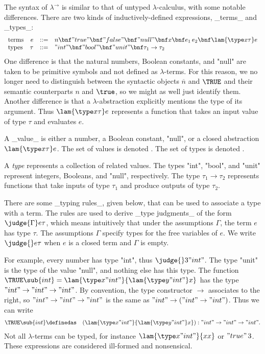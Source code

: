 The syntax of $\lambda^\to$ is similar to that of untyped $\lambda$-calculus, with some notable differences. There are two kinds of inductively-defined expressions, _terms_ and _types_:
\[
\begin{array}{lrcl}
\mbox{terms} & e &::=& n \bnf "true" \bnf "false" \bnf "null" \bnf x \bnf e_1\,e_2 \bnf \lam{\type x\tau}e\\
\mbox{types} & \tau &::=& "int" \bnf "bool" \bnf "unit" \bnf \tau _1 \to \tau _2
\end{array}
\]
One difference is that the natural numbers, Boolean constants, and "null" are taken to be primitive symbols and not defined as $\lambda$-terms. For this reason, we no longer need to distinguish between the syntactic objects $\overline n$ and $\TRUE$ and their semantic counterparts $n$ and $\true$, so we might as well just identify them.
Another difference is that a $\lambda$-abstraction explicitly mentions the type of its argument. Thus
$\lam{\type x\tau}e$ represents a function that takes an input value of type $\tau$ and evaluates $e$.

A _value_ is either a number, a Boolean constant, "null", or a closed abstraction $\lam{\type x\tau}e$. The set of values is denoted \Val. The set of types is denoted \Type.

A \emph{type} represents a collection of related values. The types "int", "bool", and "unit" represent integers, Booleans, and "null", respectively. The type $\tau_1\to\tau_2$ represents functions that take inputs of type $\tau_1$ and produce outputs of type $\tau_2$.

There are some _typing rules_, given below, that can be used to associate a type
with a term. The rules are used to derive _type judgments_ of the form 
$\judge{\Gamma}e\tau$, which means intuitively that under the assumptions
$\Gamma$, the term $e$ has type $\tau$.
The assumptions $\Gamma$ specify types for the free variables of $e$.
We write $\judge{}e\tau$ when $e$ is a closed term and $\Gamma$ is empty.

For example, every number has type "int", thus $\judge{}3{"int"}$.
The type "unit" is the type of the value "null", and nothing else
has this type. The function $\TRUE\sub{int} =
\lam{\type x{"int"}}{\lam{\type y{"int"}}x}$ has the type $"int"
\to "int" \to "int"$.
By convention, the type constructor $\to$ associates to the right, so
$"int" \to "int" \to "int"$
is the same as
$"int" \to ("int" \to "int")$.
Thus we can write
\begin{eqnarray*}
\TRUE\sub{int} &\definedas& (\lam{\type x{"int"}}{\lam{\type y{"int"}}x}) : "int" \to "int" \to "int".
\end{eqnarray*}
Not all $\lambda$-terms can be typed, for instance $\lam{\type x{"int"}}{xx}$ or $"true"\,3$. These expressions are considered ill-formed and nonsensical.

